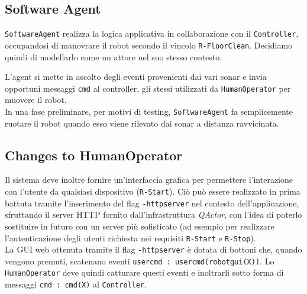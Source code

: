\documentclass{../llncs}
\newcommand{\codescript}[1]{{\mbox{\small{\texttt{#1}}}}\xspace}
\newcommand{\code}[1]{{\color{blue}\small{\texttt{#1}}}}
\newcommand{\qa}{\textsf{\textit{QActor}}\xspace}
\newcommand{\labelssec}[1]{\label{ssec:#1}}
\begin{document}


\subsection{Software Agent}
\labelssec{swagPA}
\texttt{SoftwareAgent} realizza la logica applicativa in collaborazione con il \texttt{Controller}, occupandosi di manovrare il robot secondo il vincolo \code{R-FloorClean}. Decidiamo quindi di modellarlo come un attore nel suo stesso contesto.

L'agent si mette in ascolto degli eventi provenienti dai vari sonar e invia opportuni messaggi \codescript{cmd} al controller, gli stessi utilizzati da \texttt{HumanOperator} per muovere il robot.\\

In una fase preliminare, per motivi di testing, \texttt{SoftwareAgent} fa semplicemente ruotare il robot quando esso viene rilevato dai sonar a distanza ravvicinata.\\



\subsection{Changes to HumanOperator}
\labelssec{humanOpPA}
Il sistema deve inoltre fornire un'interfaccia grafica per permettere l'interazione con l'utente da qualsiasi dispositivo (\code{R-Start}). Ciò può essere realizzato in prima battuta tramite l'inserimento del flag \codescript{-httpserver} nel contesto dell'applicazione, sfruttando il server HTTP fornito dall'infrastruttura \qa, con l'idea di poterlo sostituire in futuro con un server più sofisticato (ad esempio per realizzare l'autenticazione degli utenti richiesta nei requisiti \code{R-Start} e \code{R-Stop}).\\



La GUI web ottenuta tramite il flag \codescript{-httpserver} è dotata di bottoni che, quando vengono premuti, scatenano eventi \codescript{usercmd : usercmd(robotgui(X))}. Lo \texttt{HumanOperator} deve quindi catturare questi eventi e inoltrarli sotto forma di messaggi \codescript{cmd : cmd(X)} al \texttt{Controller}.
\end{document}
